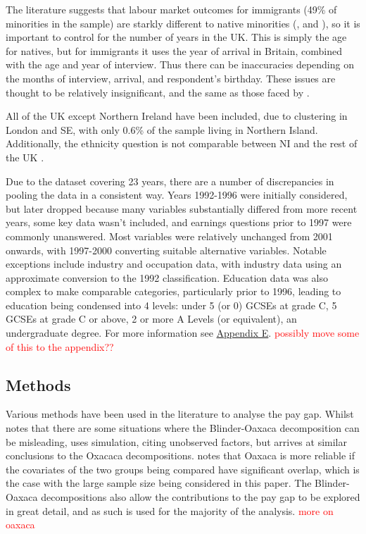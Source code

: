 \documentclass[class=article, crop=false]{standalone}
\begin{document}
The literature suggests that labour market outcomes for immigrants (49\% of minorities in the sample) are starkly different to native minorities (\citet{Brynin}, \citet{ONSe} and \citet{Shields}), so it is important to control for the number of years in the UK. This is simply the age for natives, but for immigrants it uses the year of arrival in Britain, combined with the age and year of interview. Thus there can be inaccuracies depending on the months of interview, arrival, and respondent’s birthday. These issues are thought to be relatively insignificant, and the same as those faced by \citet{Berthoud}.

All of the UK except Northern Ireland have been included, due to clustering in London and SE, with only 0.6\% of the sample living in Northern Island. Additionally, the ethnicity question is not comparable between NI and the rest of the UK \citep{Longhi}.

Due to the dataset covering 23 years, there are a number of discrepancies in pooling the data in a consistent way. Years 1992-1996 were initially considered, but later dropped because many variables substantially differed from more recent years, some key data wasn't included, and earnings questions prior to 1997 were commonly unanswered. Most variables were relatively unchanged from 2001 onwards, with 1997-2000 converting suitable alternative variables. Notable exceptions include industry and occupation data, with industry data using an approximate conversion to the 1992 classification. Education data was also complex to make comparable categories, particularly prior to 1996, leading to education being condensed into 4 levels: under 5 (or 0) GCSEs at grade C, 5 GCSEs at grade C or above, 2 or more A Levels (or equivalent), an undergraduate degree. For more information see \hyperref[sec:appendixE]{Appendix E}. \textcolor{red}{possibly move some of this to the appendix??}

\subsection{Methods}
\label{sec:Methods}
Various methods have been used in the literature to analyse the pay gap. Whilst \citet{Barsky} notes that there are some situations where the Blinder-Oaxaca decomposition can be misleading, \citet{Olsen} uses simulation, citing unobserved factors, but arrives at similar conclusions to the Oxacaca decompositions. \citet{Longhi} notes that Oaxaca is more reliable if the covariates of the two groups being compared have significant overlap, which is the case with the large sample size being considered in this paper. The Blinder-Oaxaca decompositions also allow the contributions to the pay gap to be explored in great detail, and as such is used for the majority of the analysis.  \textcolor{red}{more on oaxaca}
\end{document}
